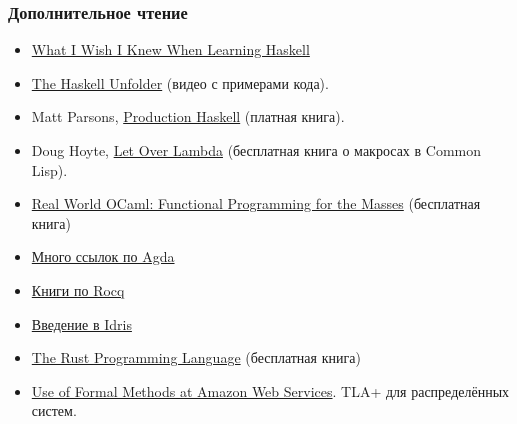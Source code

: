 \documentclass[11pt]{beamer}
\begin{document}
\begin{frame}[fragile]
  \frametitle{Дополнительное чтение}
  \begin{itemize}
    \setlength{\itemsep}{0pt}
    \item \href{https://sdiehl.github.io/wiwinwlh/}{What I Wish I Knew When Learning Haskell}
    \item \href{https://well-typed.com/blog/tags/unfolder/}{The Haskell Unfolder} (видео с примерами кода).
    \item Matt Parsons, \href{https://leanpub.com/production-haskell}{Production Haskell} (платная книга).
    \item Doug Hoyte, \href{https://letoverlambda.com/}{Let Over Lambda} (бесплатная книга о макросах в Common Lisp).
    \item \href{https://realworldocaml.org/}{Real World OCaml: Functional Programming for the Masses} (бесплатная книга)
    \item \href{https://wiki.portal.chalmers.se/agda/pmwiki.php?n=Main.Documentation}{Много ссылок по Agda}
    \item \href{https://rocq-prover.org/docs}{Книги по Rocq}
    \item \href{https://idris2.readthedocs.io/en/latest/tutorial/index.html}{Введение в Idris}
    \item \href{https://doc.rust-lang.org/book/}{The Rust Programming Language} (бесплатная книга)
    \item \href{https://blog.acolyer.org/2014/11/24/use-of-formal-methods-at-amazon-web-services/}{Use of Formal Methods at Amazon Web Services}. TLA+ для распределённых систем.
  \end{itemize}
\end{frame}
\end{document}

